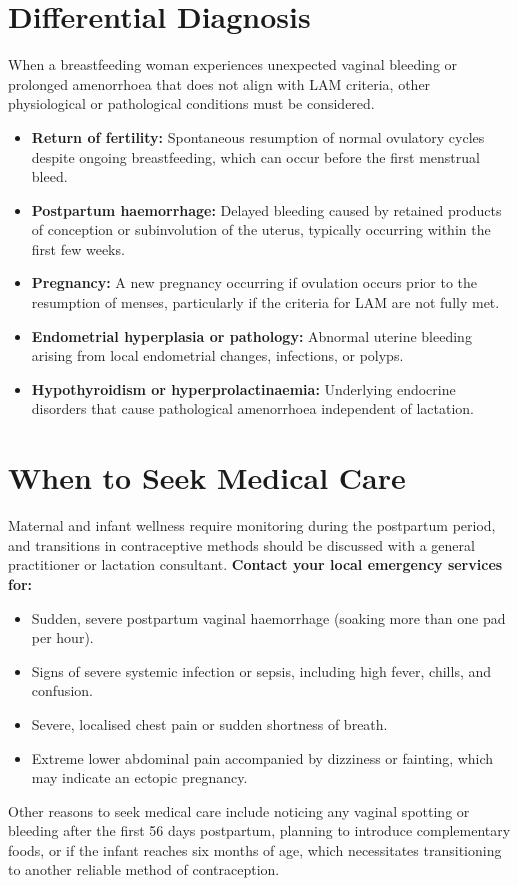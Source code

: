 \section*{Differential Diagnosis}
When a breastfeeding woman experiences unexpected vaginal bleeding or prolonged amenorrhoea that does not align with LAM criteria, other physiological or pathological conditions must be considered.
\begin{itemize}
    \item \textbf{Return of fertility:} Spontaneous resumption of normal ovulatory cycles despite ongoing breastfeeding, which can occur before the first menstrual bleed.
    \item \textbf{Postpartum haemorrhage:} Delayed bleeding caused by retained products of conception or subinvolution of the uterus, typically occurring within the first few weeks.
    \item \textbf{Pregnancy:} A new pregnancy occurring if ovulation occurs prior to the resumption of menses, particularly if the criteria for LAM are not fully met.
    \item \textbf{Endometrial hyperplasia or pathology:} Abnormal uterine bleeding arising from local endometrial changes, infections, or polyps.
    \item \textbf{Hypothyroidism or hyperprolactinaemia:} Underlying endocrine disorders that cause pathological amenorrhoea independent of lactation.
\end{itemize}

\section*{When to Seek Medical Care}
Maternal and infant wellness require monitoring during the postpartum period, and transitions in contraceptive methods should be discussed with a general practitioner or lactation consultant.
\textbf{Contact your local emergency services for:}
\begin{itemize}
    \item Sudden, severe postpartum vaginal haemorrhage (soaking more than one pad per hour).
    \item Signs of severe systemic infection or sepsis, including high fever, chills, and confusion.
    \item Severe, localised chest pain or sudden shortness of breath.
    \item Extreme lower abdominal pain accompanied by dizziness or fainting, which may indicate an ectopic pregnancy.
\end{itemize}
Other reasons to seek medical care include noticing any vaginal spotting or bleeding after the first 56 days postpartum, planning to introduce complementary foods, or if the infant reaches six months of age, which necessitates transitioning to another reliable method of contraception.

